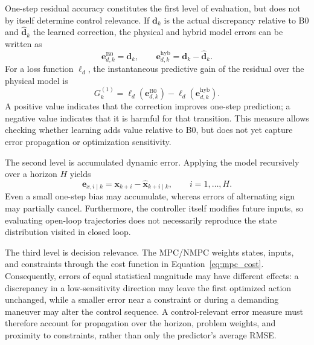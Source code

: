 \documentclass[12pt,a4paper]{report}
\begin{document}
One-step residual accuracy constitutes the first level of evaluation, but does not by itself determine control relevance. If $\mathbf{d}_k$ is the actual discrepancy relative to B0 and $\hat{\mathbf{d}}_k$ the learned correction, the physical and hybrid model errors can be written as
\begin{equation}
    \mathbf{e}^{\mathrm{B0}}_{d,k}=\mathbf{d}_k,
    \qquad
    \mathbf{e}^{\mathrm{hyb}}_{d,k}
    =
    \mathbf{d}_k-\hat{\mathbf{d}}_k.
    \label{eq:physics_hybrid_residual_errors}
\end{equation}
For a loss function $\ell_d$, the instantaneous predictive gain of the residual over the physical model is
\begin{equation}
    G^{(1)}_k
    =
    \ell_d\!\left(\mathbf{e}^{\mathrm{B0}}_{d,k}\right)
    -
    \ell_d\!\left(\mathbf{e}^{\mathrm{hyb}}_{d,k}\right).
    \label{eq:one_step_residual_gain}
\end{equation}
A positive value indicates that the correction improves one-step prediction; a negative value indicates that it is harmful for that transition. This measure allows checking whether learning adds value relative to B0, but does not yet capture error propagation or optimization sensitivity.

The second level is accumulated dynamic error. Applying the model recursively over a horizon $H$ yields
\begin{equation}
    \mathbf{e}_{x,i\mid k}
    =
    \mathbf{x}_{k+i}
    -
    \hat{\mathbf{x}}_{k+i\mid k},
    \qquad i=1,\ldots,H.
    \label{eq:multistep_state_prediction_error}
\end{equation}
Even a small one-step bias may accumulate, whereas errors of alternating sign may partially cancel. Furthermore, the controller itself modifies future inputs, so evaluating open-loop trajectories does not necessarily reproduce the state distribution visited in closed loop.

The third level is decision relevance. The MPC/NMPC weights states, inputs, and constraints through the cost function in Equation~\eqref{eq:mpc_cost}. Consequently, errors of equal statistical magnitude may have different effects: a discrepancy in a low-sensitivity direction may leave the first optimized action unchanged, while a smaller error near a constraint or during a demanding maneuver may alter the control sequence. A control-relevant error measure must therefore account for propagation over the horizon, problem weights, and proximity to constraints, rather than only the predictor's average RMSE.
\end{document}
